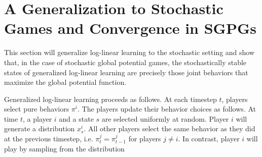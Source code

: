 \section{A Generalization to Stochastic Games and Convergence in SGPGs}

This section will generalize log-linear learning to the stochastic setting and show that, in the case of stochastic global potential games, the stochastically stable states of generalized log-linear learning are precisely those joint behaviors that maximize the global potential function. 

Generalized log-linear learning proceeds as follows. At each timestep $t$, players select pure behaviors $\pi^i$. The players update their behavior choices as follows. At time $t$, a player $i$ and a state $s$ are selected uniformly at random. Player $i$ will generate a distribution $x^i_s$. All other players select the same behavior as they did at the previous timestep, i.e. $\pi_t^j = \pi_{t-1}^j$ for players $j \neq i$. In contrast, player $i$ will play by sampling from the distribution


